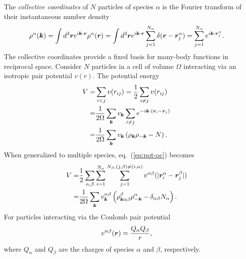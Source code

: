 \begin{definition}
The \textit{collective coordinates} of $N$ particles of species $\alpha$ is the Fourier transform of their instantaneous number density
\begin{align}
\rho^\alpha(\boldsymbol{k}) = \int d^3\boldsymbol{r} e^{i\boldsymbol{k}\cdot\boldsymbol{r}} \rho^\alpha(\boldsymbol{r})
= \int d^3\boldsymbol{r} e^{i\boldsymbol{k}\cdot\boldsymbol{r}} \sum\limits_{j=1}^{N_\alpha} \delta(\boldsymbol{r}-\boldsymbol{r}^\alpha_j)=\sum\limits_{j=1}^{N_\alpha} e^{i\boldsymbol{k}\cdot\boldsymbol{r}_j^\alpha}. \label{eq:rhok}
\end{align}
The collective coordinates provide a fixed basis for many-body functions in reciprocal space. Consider $N$ particles in a cell of volume $\Omega$ interacting via an isotropic pair potential $v(r)$. The potential energy
\begin{align}
V =& \sum\limits_{i<j} v(r_{ij}) = \frac{1}{2} \sum\limits_{i\neq j} v(r_{ij}) \nonumber \\
=& \frac{1}{2\Omega} \sum\limits_{\boldsymbol{k}}v_{\boldsymbol{k}} \sum\limits_{i\neq j}   e^{-i\boldsymbol{k}\cdot(\boldsymbol{r}_i-\boldsymbol{r}_j)} \nonumber \\
=& \frac{1}{2\Omega} \sum\limits_{\boldsymbol{k}}v_{\boldsymbol{k}} \left( \rho_{\boldsymbol{k}}\rho_{-\boldsymbol{k}}-N \right). \label{eq:pot-oc}
\end{align}
When generalized to multiple species, eq.~(\ref{eq:pot-oc}) becomes
\begin{align}
V =& \frac{1}{2}\sum\limits_{\alpha, \beta} \sum\limits_{i=1}^{N_\alpha} \sum\limits_{j=1}^{N_\beta, (j,\beta)\neq(i,\alpha)} v^{\alpha\beta}(\vert\boldsymbol{r}_i^\alpha - \boldsymbol{r}_j^\beta \vert) \nonumber \\
=& \frac{1}{2\Omega} \sum\limits_{\boldsymbol{k}}
v^{\alpha\beta}_{\boldsymbol{k}} \left( \rho^\beta_{\boldsymbol{k}\alpha\beta}\rho^\alpha_{-\boldsymbol{k}}-\delta_{\alpha\beta}N_\alpha \right). \label{eq:pot-mc}
\end{align}
For particles interacting via the Coulomb pair potential
\begin{align}
v^{\alpha\beta}(\boldsymbol{r}) = \frac{Q_\alpha Q_\beta}{r},
\end{align}
where $Q_\alpha$ and $Q_\beta$ are the charges of species $\alpha$ and $\beta$, respectively.
\end{definition}

